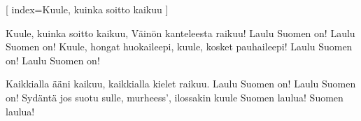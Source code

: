[%
index={Kuule, kuinka soitto kaikuu}
]

\beginverse
Kuule, kuinka soitto kaikuu, Väinön kanteleesta raikuu!
Laulu Suomen on! Laulu Suomen on!
Kuule, hongat huokaileepi, kuule, kosket pauhaileepi!
Laulu Suomen on! Laulu Suomen on!
\endverse

\beginverse
Kaikkialla ääni kaikuu, kaikkialla kielet raikuu.
Laulu Suomen on! Laulu Suomen on!
Sydäntä jos suotu sulle, murheess', ilossakin kuule
Suomen laulua! Suomen laulua!
\endverse

\endsong